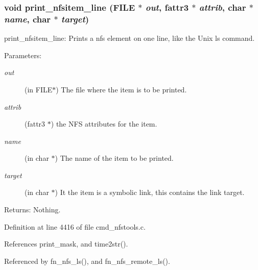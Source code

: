 \subsubsection{\setlength{\rightskip}{0pt plus 5cm}void print\_\-nfsitem\_\-line (FILE $\ast$ {\em out}, fattr3 $\ast$ {\em attrib}, char $\ast$ {\em name}, char $\ast$ {\em target})}\label{cmd__nfstools_8c_a119}


print\_\-nfsitem\_\-line: Prints a nfs element on one line, like the Unix ls command.

\begin{Desc}
\item[Parameters:]
\begin{description}
\item[{\em out}](in FILE$\ast$) The file where the item is to be printed. \item[{\em attrib}](fattr3 $\ast$) the NFS attributes for the item. \item[{\em name}](in char $\ast$) The name of the item to be printed. \item[{\em target}](in char $\ast$) It the item is a symbolic link, this contains the link target. \end{description}
\end{Desc}
\begin{Desc}
\item[Returns:]Nothing. \end{Desc}


Definition at line 4416 of file cmd\_\-nfstools.c.

References print\_\-mask, and time2str().

Referenced by fn\_\-nfs\_\-ls(), and fn\_\-nfs\_\-remote\_\-ls().